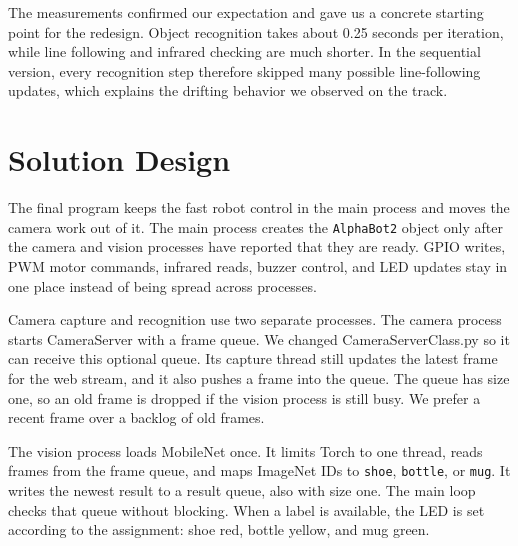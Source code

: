 \documentclass{article}
\begin{document}
The measurements confirmed our expectation and gave us a concrete starting point for the redesign. Object recognition takes about 0.25 seconds per iteration, while line following and infrared checking are much shorter. In the sequential version, every recognition step therefore skipped many possible line-following updates, which explains the drifting behavior we observed on the track.

\section{Solution Design}

The final program keeps the fast robot control in the main process and moves the camera work out of it. The main process creates the \texttt{AlphaBot2} object only after the camera and vision processes have reported that they are ready. GPIO writes, PWM motor commands, infrared reads, buzzer control, and LED updates stay in one place instead of being spread across processes.

Camera capture and recognition use two separate processes. The camera process starts CameraServer with a frame queue. We changed CameraServerClass.py so it can receive this optional queue. Its capture thread still updates the latest frame for the web stream, and it also pushes a frame into the queue. The queue has size one, so an old frame is dropped if the vision process is still busy. We prefer a recent frame over a backlog of old frames.

The vision process loads MobileNet once. It limits Torch to one thread, reads frames from the frame queue, and maps ImageNet IDs to \texttt{shoe}, \texttt{bottle}, or \texttt{mug}. It writes the newest result to a result queue, also with size one. The main loop checks that queue without blocking. When a label is available, the LED is set according to the assignment: shoe red, bottle yellow, and mug green.
\end{document}
